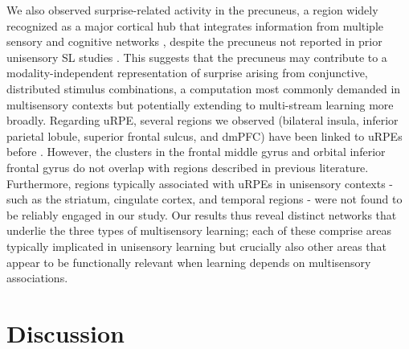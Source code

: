 \documentclass{article}
\begin{document}
We also observed surprise-related activity in the precuneus, a region widely recognized as a major cortical hub that integrates information from multiple sensory and cognitive networks \cite{cavanna2006precuneus, yamaguchi2024structural, jitsuishi2023characteristic}, despite the precuneus not reported in prior unisensory SL studies \cite{visalli2019bayesian, konovalov2018neurocomputational, o2013dissociable, corlett2022meta}. This suggests that the precuneus may contribute to a modality-independent representation of surprise arising from conjunctive, distributed stimulus combinations, a computation most commonly demanded in multisensory contexts but potentially extending to multi-stream learning more broadly. Regarding uRPE, several regions we observed (bilateral insula, inferior parietal lobule, superior frontal sulcus, and dmPFC) have been linked to uRPEs before \cite{corlett2022meta, fouragnan2018separate}. However, the clusters in the frontal middle gyrus and orbital inferior frontal gyrus do not overlap with regions described in previous literature. Furthermore, regions typically associated with uRPEs in unisensory contexts - such as the striatum, cingulate cortex, and temporal regions - were not found to be reliably engaged in our study. Our results thus reveal distinct networks that underlie the three types of multisensory learning; each of these comprise areas typically implicated in unisensory learning but crucially also other areas that appear to be functionally relevant when learning depends on multisensory associations.

\section*{Discussion}
\end{document}

